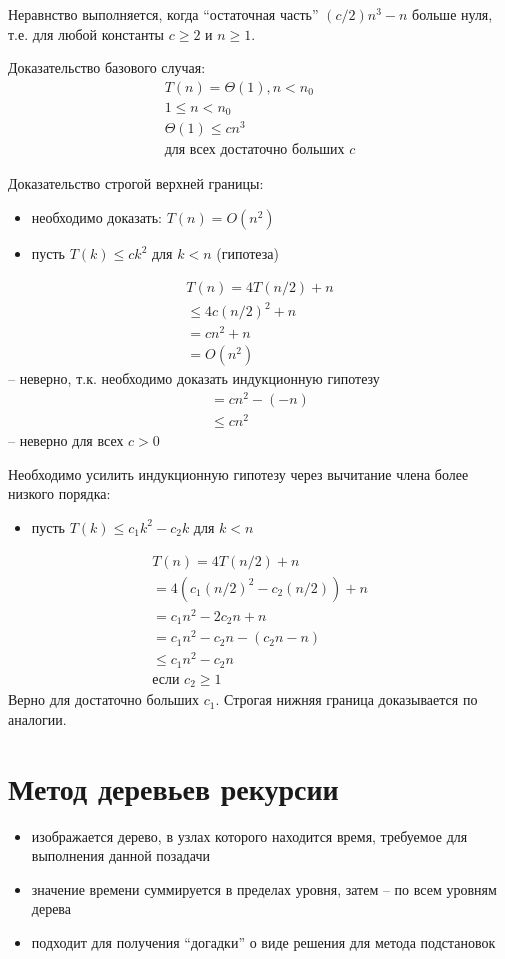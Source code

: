 \documentclass[11pt]{article}
\begin{document}
Неравнство выполняется, когда ``остаточная часть'' $(c/2)n^3 -n$ больше нуля, т.е. для любой константы $c \geqslant 2$ и $n \geqslant 1$.

Доказательство базового случая:
\begin{align*}
  T(n) = \Theta(1), n < n_0 \\
    1 \leqslant n < n_0 \\
    \Theta(1) \leqslant c n^3 \\
    \text{для всех достаточно больших } c
\end{align*}

Доказательство строгой верхней границы:
\begin{itemize}
\item необходимо доказать: $T(n) = O(n^2)$
\item пусть $T(k) \leqslant c k^2$ для $k < n$ (гипотеза)
\end{itemize}
\begin{align*}
  T(n) = 4T(n/2) + n \\
    \leqslant 4c(n/2)^2 + n \\
    = c n^2 + n \\
    = O(n^2)
\end{align*}
-- неверно, т.к. необходимо доказать индукционную гипотезу
\begin{align*}
    = c n^2 - (-n)\\
    \leqslant c n^2
\end{align*}
-- неверно для всех $c > 0$

Необходимо усилить индукционную гипотезу через вычитание члена более низкого порядка:
\begin{itemize}
\item пусть $T(k) \leqslant c_1 k^2 - c_2 k$ для $k < n$
\end{itemize}
\begin{align*}
  T(n) = 4T(n/2) + n \\
    = 4(c_1(n/2)^2 - c_2(n/2)) + n \\
    = c_1 n^2 - 2c_2 n + n \\
    = c_1 n^2 - c_2 n - (c_2 n - n) \\
    \leqslant c_1 n^2 - c_2 n \\
    \text{если } c_2 \geqslant 1
\end{align*}
Верно для достаточно больших $c_1$. Строгая нижняя граница доказывается по аналогии.

\section{Метод деревьев рекурсии}
\begin{itemize}
\item изображается дерево, в узлах которого находится время, требуемое для выполнения данной позадачи
\item значение времени суммируется в пределах уровня, затем -- по всем уровням дерева
\item подходит для получения ``догадки'' о виде решения для метода подстановок
\end{itemize}
\end{document}
